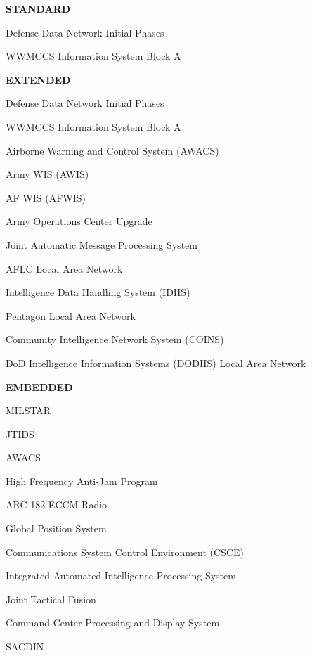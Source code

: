 \documentclass[11pt,final]{article}
\begin{document}
\begin{landscape}
\newpage


\begin{center}
\begin{multicols*}{4}
\raggedcolumns %
\raggedright

    \textbf{STANDARD}

    Defense Data Network Initial Phases

    WWMCCS Information System Block A

    \columnbreak

    \textbf{EXTENDED}

    Defense Data Network Initial Phases

    WWMCCS Information System Block A

    Airborne Warning and Control System (AWACS)

    Army WIS (AWIS)

    AF WIS (AFWIS)

    Army Operations Center Upgrade

    Joint Automatic Message Processing System

    AFLC Local Area Network

    Intelligence Data Handling System (IDHS)

    Pentagon Local Area Network

    Community Intelligence Network System (COINS)

    DoD Intelligence Information Systems (DODIIS) Local Area Network

    \columnbreak

    \textbf{EMBEDDED}

    MILSTAR

    JTIDS

    AWACS

    High Frequency Anti-Jam Program

    ARC-182-ECCM Radio

    Global Position System

    Communications System Control Environment (CSCE)

    Integrated Automated Intelligence Processing System

    Joint Tactical Fusion

    Command Center Processing and Display System

    SACDIN


\end{multicols*}
\end{center}
\end{landscape}
\end{document}
